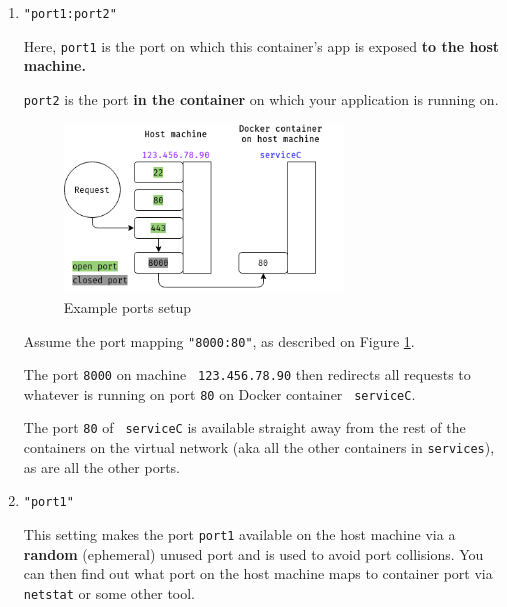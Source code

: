 \documentclass{article}
\newcommand{\dockerinline}[1]{\lstinline[language=docker, style=cstyle, basicstyle=\ttfamily\normalsize]{#1}}
\begin{document}
\begin{enumerate}
    \item{
            \texttt{"port1:port2"}

            Here, \texttt{port1} is the port on which this container's app is exposed \textbf{to the host machine.}

            \texttt{port2} is the port \textbf{in the container} on which your application is running on.

            \begin{figure}[h]
                \centering
                \includegraphics[width=0.7\textwidth]{img/docker_ports.png}
                \caption{Example ports setup}
                \label{preparations:dockerports}
                            \end{figure}

            Assume the port mapping \texttt{"8000:80"}, as described on Figure \ref{preparations:dockerports}.

            The port \texttt{8000} on machine \texttt{\color[HTML]{9933FF} 123.456.78.90} then redirects all requests to whatever is running on port \texttt{80} on Docker container \texttt{\color[HTML]{3333FF} serviceC}.

            The port \texttt{80} of \texttt{\color[HTML]{3333FF} serviceC} is available straight away from the rest of the containers on the virtual network (aka all the other containers in \dockerinline{services}), as are all the other ports.
        }
    \item{
            \texttt{"port1"}

            This setting makes the port \texttt{port1} available on the host machine via a \textbf{random} (ephemeral) unused port and is used to avoid port collisions. You can then find out what port on the host machine maps to container port via \texttt{netstat} or some other tool.
        }
\end{enumerate}
\end{document}

